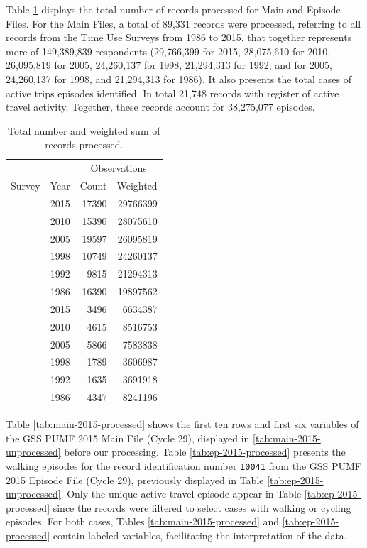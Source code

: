 \documentclass[Royal,times,sageh]{sagej}
\begin{document}
Table \ref{tab:processed-obs} displays the total number of records
processed for Main and Episode Files. For the Main Files, a total of
89,331 records were processed, referring to all records from the Time
Use Surveys from 1986 to 2015, that together represents more of
149,389,839 respondents (29,766,399 for 2015, 28,075,610 for 2010,
26,095,819 for 2005, 24,260,137 for 1998, 21,294,313 for 1992, and for
2005, 24,260,137 for 1998, and 21,294,313 for 1986). It also presents
the total cases of active trips episodes identified. In total 21,748
records with register of active travel activity. Together, these records
account for 38,275,077 episodes.

\begingroup\fontsize{10}{12}\selectfont

\begin{longtable}[t]{lrrr}
\caption{\label{tab:table_df_processed}\label{tab:processed-obs}Total number and weighted sum of records processed.}\\
\toprule
\multicolumn{2}{c}{ } & \multicolumn{2}{c}{Observations} \\
\cmidrule(l{3pt}r{3pt}){3-4}
Survey & Year & Count & Weighted\\
\midrule
 & 2015 & 17390 & 29766399\\
\nopagebreak
 & 2010 & 15390 & 28075610\\
\nopagebreak
 & 2005 & 19597 & 26095819\\
\nopagebreak
 & 1998 & 10749 & 24260137\\
\nopagebreak
 & 1992 & 9815 & 21294313\\
\nopagebreak
\multirow[t]{-6}{*}{\raggedright\arraybackslash Main} & 1986 & 16390 & 19897562\\
\cmidrule{1-4}\pagebreak[0]
 & 2015 & 3496 & 6634387\\
\nopagebreak
 & 2010 & 4615 & 8516753\\
\nopagebreak
 & 2005 & 5866 & 7583838\\
\nopagebreak
 & 1998 & 1789 & 3606987\\
\nopagebreak
 & 1992 & 1635 & 3691918\\
\nopagebreak
\multirow[t]{-6}{*}{\raggedright\arraybackslash Episode} & 1986 & 4347 & 8241196\\
\bottomrule
\end{longtable}
\endgroup{}

Table \ref{tab:main-2015-processed} shows the first ten rows and first
six variables of the GSS PUMF 2015 Main File (Cycle 29), displayed in
\ref{tab:main-2015-unprocessed} before our processing. Table
\ref{tab:ep-2015-processed} presents the walking episodes for the record
identification number \texttt{10041} from the GSS PUMF 2015 Episode File
(Cycle 29), previously displayed in Table \ref{tab:ep-2015-unprocessed}.
Only the unique active travel episode appear in Table
\ref{tab:ep-2015-processed} since the records were filtered to select
cases with walking or cycling episodes. For both cases, Tables
\ref{tab:main-2015-processed} and \ref{tab:ep-2015-processed} contain
labeled variables, facilitating the interpretation of the data.
\end{document}

